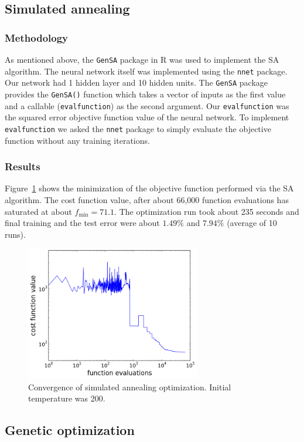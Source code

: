\documentclass[10pt,letterpaper]{article}
\begin{document}
\subsection{Simulated annealing}
\subsubsection{Methodology}\label{meth1}
As mentioned above, the {\tt GenSA} package in R was used to implement the SA algorithm. The neural network itself was implemented using the {\tt nnet} package. Our network had 1 hidden layer and 10 hidden units. The {\tt GenSA} package provides the {\tt GenSA()} function which takes a vector of inputs as the first value and a callable ({\tt evalfunction}) as the second argument. Our {\tt evalfunction} was the squared error objective function value of the neural network. To implement {\tt evalfunction} we asked the {\tt nnet} package to simply evaluate the objective function without any training iterations. 
\subsubsection{Results}
Figure~\ref{sal} shows the minimization of the objective function performed via the SA algorithm. The cost function value, after about 66,000 function evaluations has saturated at about $f_{\text{min}} = 71.1$. The optimization run took about 235 seconds and final training and the test error were about $1.49\%$ and $7.94\%$ (average of 10 runs). 

\begin{figure}[!htbp]
	\centering
	\includegraphics[width=3in]{../plots/simulatedannealing.png}
	\caption{Convergence of simulated annealing optimization. Initial temperature was 200. \label{sal}}
\end{figure}
\subsection{Genetic optimization}
\end{document}
